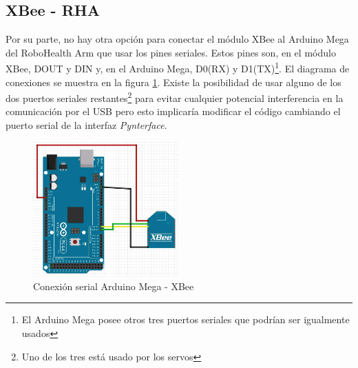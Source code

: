 \subsection{XBee - RHA}

Por su parte, no hay otra opción para conectar el módulo XBee al Arduino Mega del RoboHealth Arm que usar los pines seriales. Estos pines son, en el módulo XBee, DOUT y DIN y, en el Arduino Mega, D0(RX) y D1(TX)\footnote{El Arduino Mega posee otros tres puertos seriales que podrían ser igualmente usados}. El diagrama de conexiones se muestra en la figura \ref{fig:AMegaXBserial}. Existe la posibilidad de usar alguno de los dos puertos seriales restantes\footnote{Uno de los tres está usado por los servos} para evitar cualquier potencial interferencia en la comunicación por el USB pero esto implicaría modificar el código cambiando el puerto serial de la interfaz \textit{Pynterface}.

\begin{figure}[hbt]
\centering
\includegraphics[width=0.5\textwidth]{figuras/AMegaXBserial.png}
\caption{Conexión serial Arduino Mega - XBee}
\label{fig:AMegaXBserial}
\end{figure}